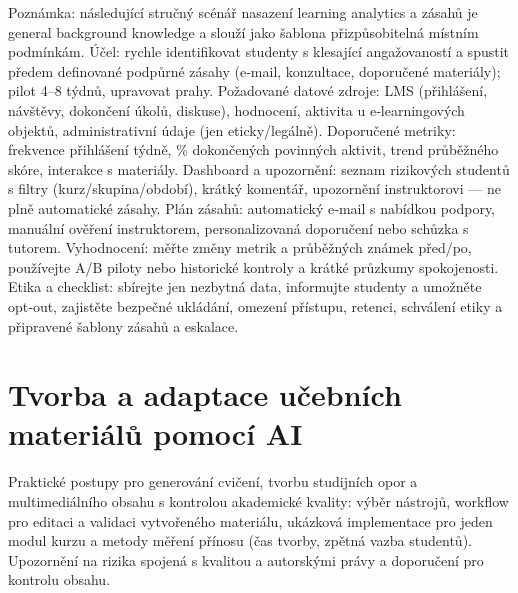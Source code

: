 \documentclass{report}%
\begin{document}
%
\noindent Poznámka: následující stručný scénář nasazení learning analytics a zásahů je general background knowledge a slouží jako šablona přizpůsobitelná místním podmínkám.
\noindent Účel: rychle identifikovat studenty s klesající angažovaností a spustit předem definované podpůrné zásahy (e‑mail, konzultace, doporučené materiály); pilot 4–8 týdnů, upravovat prahy.
\noindent Požadované datové zdroje: LMS (přihlášení, návštěvy, dokončení úkolů, diskuse), hodnocení, aktivita u e‑learningových objektů, administrativní údaje (jen eticky/legálně).
\noindent Doporučené metriky: frekvence přihlášení týdně, \% dokončených povinných aktivit, trend průběžného skóre, interakce s materiály.
\noindent Dashboard a upozornění: seznam rizikových studentů s filtry (kurz/skupina/období), krátký komentář, upozornění instruktorovi — ne plně automatické zásahy.
\noindent Plán zásahů: automatický e‑mail s nabídkou podpory, manuální ověření instruktorem, personalizovaná doporučení nebo schůzka s tutorem.
\noindent Vyhodnocení: měřte změny metrik a průběžných známek před/po, používejte A/B piloty nebo historické kontroly a krátké průzkumy spokojenosti.
\noindent Etika a checklist: sbírejte jen nezbytná data, informujte studenty a umožněte opt‑out, zajistěte bezpečné ukládání, omezení přístupu, retenci, schválení etiky a připravené šablony zásahů a eskalace.%

%
\section{Tvorba a adaptace učebních materiálů pomocí AI}%
Praktické postupy pro generování cvičení, tvorbu studijních opor a multimediálního obsahu s kontrolou akademické kvality: výběr nástrojů, workflow pro editaci a validaci vytvořeného materiálu, ukázková implementace pro jeden modul kurzu a metody měření přínosu (čas tvorby, zpětná vazba studentů). Upozornění na rizika spojená s kvalitou a autorskými právy a doporučení pro kontrolu obsahu.%
\end{document}
